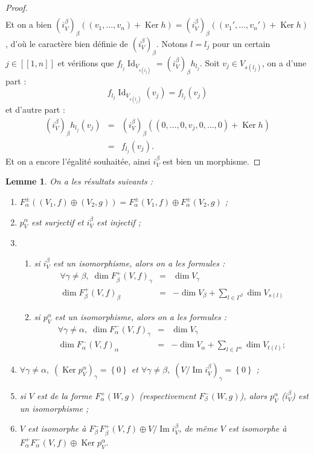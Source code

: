 \documentclass[a4paper,10pt]{article}
\newtheorem{lm}{Lemme}[section]
\DeclareMathOperator{\Ker}{Ker}
\DeclareMathOperator{\Id}{Id}
\DeclareMathOperator{\Img}{Im}
\begin{document}
\begin{proof}
\[\begin{array}{rll}
\end{array}
\]
Et on a bien $(i_{V}^{\beta})_{\beta}((v_{1},\dots,v_{n})+\Ker h)=(i_{V}^{\beta})_{\beta}((v_{1}',\dots,v_{n}')+\Ker h)
$, d'où le caractère bien définie de $(i_{V}^{\beta})_{\beta}$. Notons $l=l_{j}$ pour un certain $j\in[\![1,n]\!]$ et vérifions que $f_{l_{j}}\Id_{V_{s(l_{j})}}=(i_{V}^{\beta})_{\beta}h_{l_{j}}$. Soit $v_{j}\in V_{s(l_{j})}$, on a d'une part :
\[
	f_{l_{j}}\Id_{V_{s(l_{j})}}(v_{j})=f_{l_{j}}(v_{j})
\]
et d'autre part :
\[
\begin{array}{rll}
	(i_{V}^{\beta})_{\beta}h_{l_{j}}(v_{j})&=& (i_{V}^{\beta})_{\beta}((0,\dots,0,v_{j},0,\dots,0)+\Ker h)\\
	&=& f_{l_{j}}(v_{j}).
\end{array}
\]
Et on a encore l'égalité souhaitée, ainsi $i_{V}^{\beta}$ est bien un morphisme.
\end{proof}
\begin{lm}
	On a les résultats suivants :
	\begin{enumerate}
		\item $F_{\alpha}^{\pm}((V_{1},f)\oplus (V_{2},g))=F_{\alpha}^{\pm}(V_{1},f)\oplus F_{\alpha}^{\pm}(V_{2},g)$ ;
		\item $p_{V}^{\alpha}$ est surjectif et $i_{V}^{\beta}$ est injectif ;
		\item \begin{enumerate}
				\item si $i_{V}^{\beta}$ est un isomorphisme, alors on a les formules :
					\[
\begin{array}{rll}
	\forall\gamma\neq\beta,\;\dim F_{\beta}^{+}(V,f)_{\gamma}&=& \dim V_{\gamma}\\
	\dim F_{\beta}^{+}(V,f)_{\beta}&=& -\dim V_{\beta}+\sum_{l\in\Gamma^{\beta}}\dim V_{s(l)}
\end{array}
					\]
				\item si $p_{V}^{\alpha}$ est un isomorphisme, alors on a les formules :
	\[
\begin{array}{rll}
	\forall\gamma\neq\alpha,\;\dim F_{\alpha}^{-}(V,f)_{\gamma}&=& \dim V_{\gamma}\\
	\dim F_{\alpha}^{-}(V,f)_{\alpha}&=& -\dim V_{\alpha}+\sum_{l\in\Gamma^{\alpha}}\dim V_{t(l)};
\end{array}
					\]
			\end{enumerate}
		\item $\forall \gamma\neq\alpha,\;(\Ker p_{V}^{\alpha})_{\gamma}=\left\{ 0 \right\}$ et $\forall \gamma\neq\beta,\;(V/\Img i_{V}^{\beta})_{\gamma}=\left\{ 0 \right\}$ ;
		\item si $V$ est de la forme $F_{\alpha}^{+}(W,g)$ (respectivement $F_{\beta}^{-}(W,g)$), alors $p_{V}^{\alpha}$ ($i_{V}^{\beta}$) est un isomorphisme ;
		\item $V$ est isomorphe à $F_{\beta}^{-}F_{\beta}^{+}(V,f)\oplus V/\Img i_{V}^{\beta}$, de même $V$ est isomorphe à $F_{\alpha}^{+}F_{\alpha}^{-}(V,f)\oplus \Ker p_{V}^{\alpha}$.
	\end{enumerate}
\end{lm}
\end{document}
